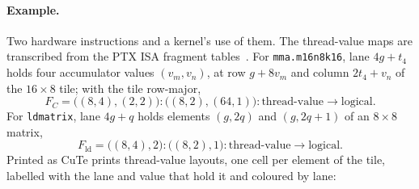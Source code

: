 \documentclass[11pt]{article}
\theoremstyle{definition}
\newcommand{\logical}{\textrm{logical}}
\newcommand{\tv}{\textrm{thread-value}}
\begin{document}
\paragraph{Example.} Two hardware instructions and a kernel's use of them.
The thread-value maps are transcribed from the PTX ISA fragment
tables~\cite{ptx}. For
\texttt{mma.m16n8k16}, lane $4g + t_4$ holds four accumulator values
$(v_m, v_n)$, at row $g + 8v_m$ and column $2t_4 + v_n$ of the $16 \times 8$
tile; with the tile row-major,
\[
F_C = \big((8,4),(2,2)\big){:}\big((8,2),(64,1)\big) : \tv \to \logical .
\]
For \texttt{ldmatrix}, lane $4g + q$ holds elements $(g, 2q)$ and $(g, 2q+1)$
of an $8 \times 8$ matrix,
\[
F_{\mathrm{ld}} = \big((8,4),2\big){:}\big((8,2),1\big) : \tv \to \logical .
\]
Printed as CuTe prints thread-value layouts, one cell per element of the tile,
labelled with the lane and value that hold it and coloured by lane:
\end{document}
